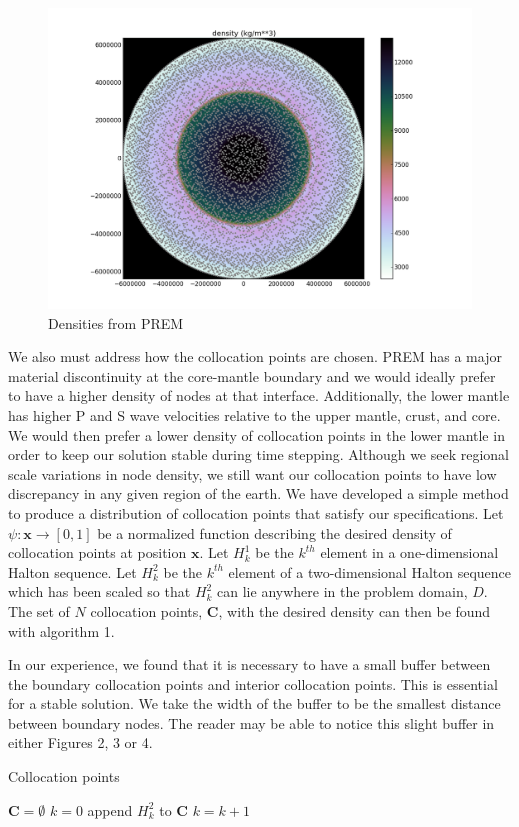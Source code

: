 \documentclass[12pt]{article}
\begin{document}
\begin{figure}
\includegraphics[scale=0.45]{figures/density}
\centering
\caption{Densities from PREM}

\end{figure}

We also must address how the collocation points are chosen.  PREM has
a major material discontinuity at the core-mantle boundary and we would
ideally prefer to have a higher density of nodes at that interface.
Additionally, the lower mantle has higher P and S wave velocities
relative to the upper mantle, crust, and core.  We would then prefer a
lower density of collocation points in the lower mantle in order to
keep our solution stable during time stepping.  Although we seek
regional scale variations in node density, we still want our
collocation points to have low discrepancy in any given region of the
earth.  We have developed a simple method to produce a distribution of
collocation points that satisfy our specifications.  Let
$\psi:\boldsymbol{x}\to [0,1]$ be a normalized function describing the
desired density of collocation points at position $\boldsymbol{x}$.
Let $H^1_k$ be the $k^{th}$ element in a one-dimensional Halton
sequence.  Let $H^2_k$ be the $k^{th}$ element of a two-dimensional
Halton sequence which has been scaled so that $H^2_k$ can lie anywhere
in the problem domain, $D$. The set of $N$ collocation points,
$\boldsymbol{C}$, with the desired density can then be found with algorithm 1.

In our experience, we found that it is necessary to have a small
buffer between the boundary collocation points and interior
collocation points.  This is essential for a stable solution.  We take
the width of the buffer to be the smallest distance between boundary
nodes.  The reader may be able to notice this slight buffer in either
Figures 2, 3 or 4.
\begin{algorithm}
\caption{Collocation points}
\begin{algorithmic}
\STATE $\boldsymbol{C} = \emptyset$
\STATE $k = 0$
    \STATE append $H^2_k$ to $\boldsymbol{C}$
  \ENDIF
  \STATE $k = k + 1$  
\ENDWHILE
\end{algorithmic}
\end{algorithm}
\end{document}
